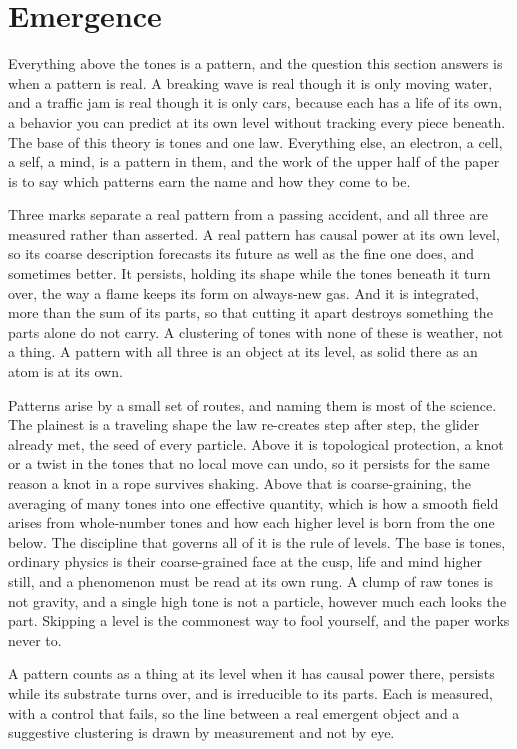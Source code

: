 \section{Emergence}

Everything above the tones is a pattern, and the question this section answers is when a pattern is real. A breaking wave is real though it is only moving water, and a traffic jam is real though it is only cars, because each has a life of its own, a behavior you can predict at its own level without tracking every piece beneath. The base of this theory is tones and one law. Everything else, an electron, a cell, a self, a mind, is a pattern in them, and the work of the upper half of the paper is to say which patterns earn the name and how they come to be.

Three marks separate a real pattern from a passing accident, and all three are measured rather than asserted. A real pattern has causal power at its own level, so its coarse description forecasts its future as well as the fine one does, and sometimes better. It persists, holding its shape while the tones beneath it turn over, the way a flame keeps its form on always-new gas. And it is integrated, more than the sum of its parts, so that cutting it apart destroys something the parts alone do not carry. A clustering of tones with none of these is weather, not a thing. A pattern with all three is an object at its level, as solid there as an atom is at its own.

Patterns arise by a small set of routes, and naming them is most of the science. The plainest is a traveling shape the law re-creates step after step, the glider already met, the seed of every particle. Above it is topological protection, a knot or a twist in the tones that no local move can undo, so it persists for the same reason a knot in a rope survives shaking. Above that is coarse-graining, the averaging of many tones into one effective quantity, which is how a smooth field arises from whole-number tones and how each higher level is born from the one below. The discipline that governs all of it is the rule of levels. The base is tones, ordinary physics is their coarse-grained face at the cusp, life and mind higher still, and a phenomenon must be read at its own rung. A clump of raw tones is not gravity, and a single high tone is not a particle, however much each looks the part. Skipping a level is the commonest way to fool yourself, and the paper works never to.

\begin{result}
A pattern counts as a thing at its level when it has causal power there, persists while its substrate turns over, and is irreducible to its parts. Each is measured, with a control that fails, so the line between a real emergent object and a suggestive clustering is drawn by measurement and not by eye. \cite{pollard2026vibetest}
\end{result}

